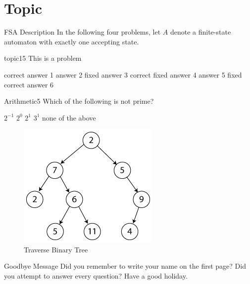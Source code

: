 \documentclass[master]{exam}
\begin{document}

\section{Topic}

\begin{block}{FSA Description}
  In the following four problems, let $A$ denote a finite-state
  automaton with exactly one accepting state.
\end{block}

\begin{problem}{topic}{15}
  This is a problem
  \begin{answers}
    \answer[correct] correct answer 1
    \answer answer 2
    \answer[fixed] fixed answer 3
     correct fixed answer 4
    \answer answer 5
     fixed correct answer 6
  \end{answers}
\end{problem}

\begin{problem}{Arithmetic}{5}
  \label{prob:arithmetic:prime}
  Which of the following is not prime?
  \begin{answers}
    \answer[correct] $2^{-1}$
    \answer[correct] $2^0$
    \answer $2^1$
    \answer $3^1$
    \answer[fixed] none of the above
  \end{answers}
\end{problem}

\begin{figure}[placement h]
  \begin{center}
      \includegraphics[scale=0.50]{binary_tree.png}
      \caption{Traverse Binary Tree}
      \label{fig:binary tree}
   \end{center}
\end{figure}

\begin{block}{Goodbye Message}
  Did you remember to write your name on the first page?  Did you
  attempt to answer every question?    Have a good holiday.
\end{block}
\end{document}
